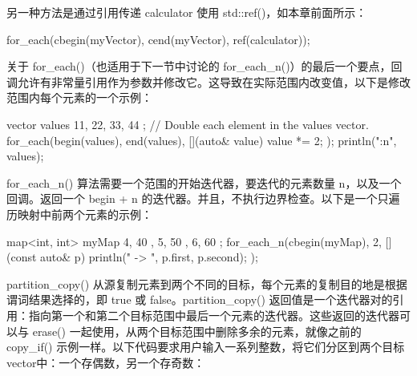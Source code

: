 另一种方法是通过引用传递 calculator 使用 std::ref()，如本章前面所示：

\begin{cpp}
for_each(cbegin(myVector), cend(myVector), ref(calculator));
\end{cpp}

关于 for\_each()（也适用于下一节中讨论的 for\_each\_n()）的最后一个要点，回调允许有非常量引用作为参数并修改它。这导致在实际范围内改变值，以下是修改范围内每个元素的一个示例：

\begin{cpp}
vector values { 11, 22, 33, 44 };
// Double each element in the values vector.
for_each(begin(values), end(values), [](auto& value) { value *= 2; });
println("{:n}", values);
\end{cpp}


for\_each\_n() 算法需要一个范围的开始迭代器，要迭代的元素数量 n，以及一个回调。返回一个 begin + n 的迭代器。并且，不执行边界检查。以下是一个只遍历映射中前两个元素的示例：

\begin{cpp}
map<int, int> myMap { { 4, 40 }, { 5, 50 }, { 6, 60 } };
for_each_n(cbegin(myMap), 2, [](const auto& p)
    { println("{} -> {}", p.first, p.second); });
\end{cpp}


partition\_copy() 从源复制元素到两个不同的目标，每个元素的复制目的地是根据谓词结果选择的，即 true 或 false。partition\_copy() 返回值是一个迭代器对的引用：指向第一个和第二个目标范围中最后一个元素的迭代器。这些返回的迭代器可以与 erase() 一起使用，从两个目标范围中删除多余的元素，就像之前的 copy\_if() 示例一样。以下代码要求用户输入一系列整数，将它们分区到两个目标vector中：一个存偶数，另一个存奇数：


